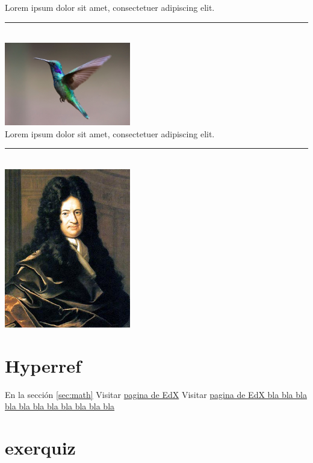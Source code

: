 \documentclass[12pt,a4paper,twoside]{article}
\begin{document}
\noindent Lorem ipsum dolor sit amet, consectetuer adipiscing elit.\\
\noindent\rule[2mm]{156pt}{3mm}\\
\noindent\includegraphics[width=156pt]{images/bird.jpg}\\
\noindent Lorem ipsum dolor sit amet, consectetuer adipiscing elit.\\
\noindent\rule[1em]{156pt}{1em}\\
\noindent\includegraphics[width=156pt]{images/GWLeibniz.png}

\section{Hyperref}

En la sección \ref{sec:math} 
Visitar \href{https://edx.org}{pagina de EdX}
Visitar \href{https://edx.org}{pagina de EdX bla bla bla bla bla bla bla bla bla bla bla}

\section{exerquiz}
%
%
%
%
\end{document}
